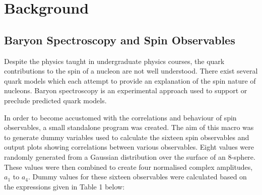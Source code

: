 \documentclass[a4paper,12pt]{article}
\begin{document}
\section{Background}
\subsection{Baryon Spectroscopy and Spin Observables} 
Despite the physics taught in undergraduate physics courses, the quark contributions to the spin of a nucleon are not well understood.  There exist several quark models which each attempt to provide an explanation of the spin nature of nucleons.  Baryon spectroscopy is an experimental approach used to support or preclude predicted quark models.  

In order to become accustomed with the correlations and behaviour of spin observables, a small standalone program was created.  The aim of this macro was to generate dummy variables used to calculate the sixteen spin observables and output plots showing correlations between various observables.
\newline
Eight values were randomly generated from a Gaussian distribution over the surface of an 8-sphere.  These values were then combined to create four normalised complex amplitudes, $a_{1}$ to $a_{4}$.  Dummy values for these sixteen observables were calculated based on the expressions given in Table 1 below:
\newline
\end{document}
